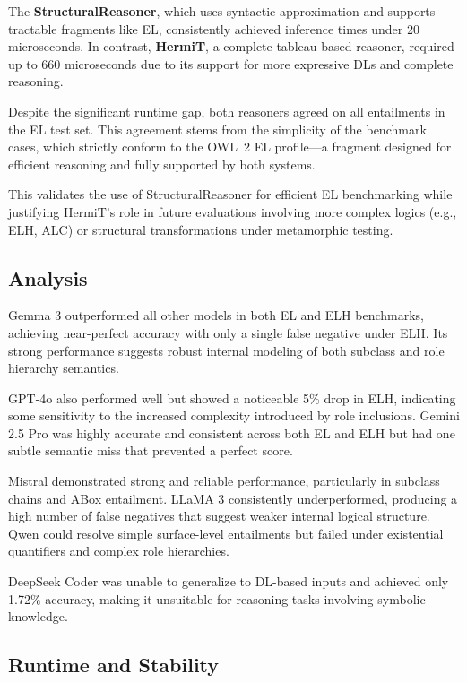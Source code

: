 \documentclass[11pt]{article}
\begin{document}
The \textbf{StructuralReasoner}, which uses syntactic approximation and supports tractable fragments like EL, consistently achieved inference times under 20 microseconds. In contrast, \textbf{HermiT}, a complete tableau-based reasoner, required up to 660 microseconds due to its support for more expressive DLs and complete reasoning.

Despite the significant runtime gap, both reasoners agreed on all entailments in the EL test set. This agreement stems from the simplicity of the benchmark cases, which strictly conform to the OWL~2 EL profile—a fragment designed for efficient reasoning and fully supported by both systems.

This validates the use of StructuralReasoner for efficient EL benchmarking while justifying HermiT’s role in future evaluations involving more complex logics (e.g., ELH, ALC) or structural transformations under metamorphic testing.

\subsection{Analysis}

Gemma 3 outperformed all other models in both EL and ELH benchmarks, achieving near-perfect accuracy with only a single false negative under ELH. Its strong performance suggests robust internal modeling of both subclass and role hierarchy semantics.

GPT-4o also performed well but showed a noticeable 5\% drop in ELH, indicating some sensitivity to the increased complexity introduced by role inclusions. Gemini 2.5 Pro was highly accurate and consistent across both EL and ELH but had one subtle semantic miss that prevented a perfect score.

Mistral demonstrated strong and reliable performance, particularly in subclass chains and ABox entailment. LLaMA 3 consistently underperformed, producing a high number of false negatives that suggest weaker internal logical structure. Qwen could resolve simple surface-level entailments but failed under existential quantifiers and complex role hierarchies.

DeepSeek Coder was unable to generalize to DL-based inputs and achieved only 1.72\% accuracy, making it unsuitable for reasoning tasks involving symbolic knowledge.

\subsection{Runtime and Stability}
\end{document}
